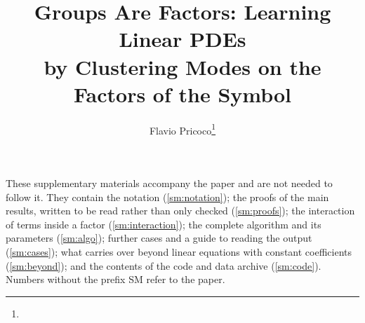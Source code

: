 \title{Groups Are Factors: Learning Linear PDEs\\by Clustering Modes on the Factors of the Symbol}
\author{Flavio Pricoco\thanks{}}


\maketitle

\noindent These supplementary materials accompany the paper and are not needed to follow it. They contain the notation
(\cref{sm:notation}); the proofs of the main results, written to be read rather than only checked
(\cref{sm:proofs}); the interaction of terms inside a factor (\cref{sm:interaction}); the complete algorithm and its
parameters (\cref{sm:algo}); further cases and a guide to reading the output (\cref{sm:cases}); what carries over
beyond linear equations with constant coefficients (\cref{sm:beyond}); and the contents of the code and data archive
(\cref{sm:code}). Numbers without the prefix SM refer to the paper.

